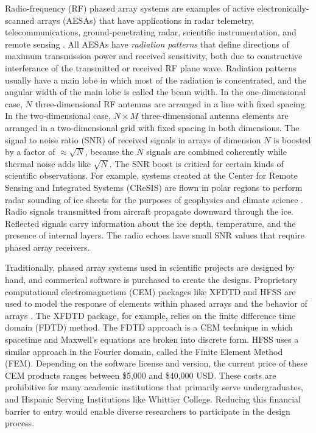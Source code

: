 \documentclass[../../main.tex]{subfiles}
\begin{document}
Radio-frequency (RF) phased array systems are examples of active electronically-scanned arrays (AESAs) that have applications in radar telemetry, telecommunications, ground-penetrating radar, scientific instrumentation, and remote sensing \cite{Vieregg_2016,AVVA201746,arnold_2020,PhysRevD.105.122006,10.3390/s21186091,10.1016/j.jappgeo.2022.104876,phased_array_book}.  All AESAs have \textit{radiation patterns} that define directions of maximum transmission power and received sensitivity, both due to constructive interferance of the transmitted or received RF plane wave.  Radiation patterns usually have a main lobe in which most of the radiation is concentrated, and the angular width of the main lobe is called the beam width.  In the one-dimensional case, $N$ three-dimensional RF antennas are arranged in a line with fixed spacing.  In the two-dimensional case, $N \times M$ three-dimensional antenna elements are arranged in a two-dimensional grid with fixed spacing in both dimensions.  The signal to noise ratio (SNR) of received signals in arrays of dimension $N$ is boosted by a factor of $\approx \sqrt{N}$, because the $N$ signals are combined coherently while thermal noise adds like $\sqrt{N}$.  The SNR boost is critical for certain kinds of scientific observations.  For example, systems created at the Center for Remote Sensing and Integrated Systems (CReSIS) are flown in polar regions to perform radar sounding of ice sheets for the purposes of geophysics and climate science \cite{arnold_2020}.  Radio signals transmitted from aircraft propagate downward through the ice.  Reflected signals carry information about the ice depth, temperature, and the presence of internal layers.  The radio echoes have small SNR values that require phased array receivers.  \\ \vspace{2.5mm}

Traditionally, phased array systems used in scientific projects are designed by hand, and commerical software is purchased to create the designs.  Proprietary computational electromagnetism (CEM) packages like XFDTD and HFSS are used to model the response of elements within phased arrays and the behavior of arrays \cite{remcom,ansys}.  The XFDTD package, for example, relies on the finite difference time domain (FDTD) method. The FDTD approach is a CEM technique in which spacetime and Maxwell’s equations are broken into discrete form.  HFSS uses a similar approach in the Fourier domain, called the Finite Element Method (FEM).  Depending on the software license and version, the current price of these CEM products ranges between \$5,000 and \$40,000 USD.  These costs are prohibitive for many academic institutions that primarily serve undergraduates, and Hispanic Serving Institutions like Whittier College.  Reducing this financial barrier to entry would enable diverse researchers to participate in the design process. \\ \vspace{2.5mm}
\end{document}
